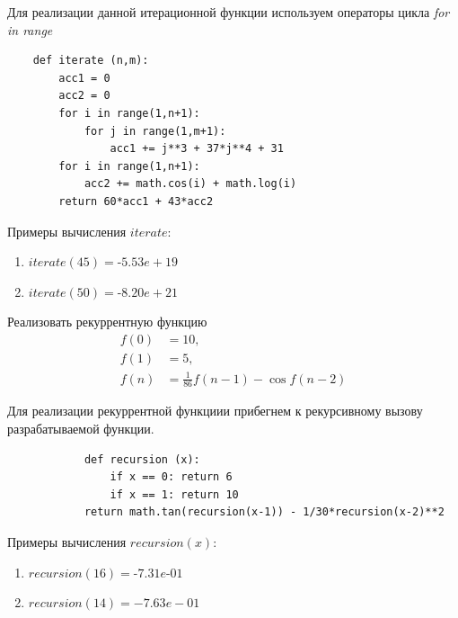 \documentclass[a4paper,14pt]{extarticle}
\begin{document}
\begin{nonum}
	Для реализации данной итерационной функции используем операторы цикла \textit{for in range}
	\vspace{3ex}
	\begin{lstlisting}
	def iterate (n,m):
		acc1 = 0
		acc2 = 0
		for i in range(1,n+1):
			for j in range(1,m+1):
				acc1 += j**3 + 37*j**4 + 31
		for i in range(1,n+1):
			acc2 += math.cos(i) + math.log(i)
		return 60*acc1 + 43*acc2
	\end{lstlisting}
	
	Примеры вычисления $iterate$:
	\begin{enumerate}
		\item $iterate(45) = ‐5.53e+19$
		\item $iterate(50) = ‐8.20e+21$
	\end{enumerate}
\end{nonum}
\begin{problem}	
	Реализовать рекуррентную функцию
	\begin{align*}
		f(0) &= 10,\\
		f(1) &= 5, \\
		f(n) &= \frac 1 {86} f(n-1) - \cos {f(n-2)}
	\end{align*}
	\begin{nonum}
		Для реализации рекуррентной функциии прибегнем к рекурсивному вызову разрабатываемой функции.
		\vspace{3ex}
		\begin{lstlisting}
			def recursion (x):
				if x == 0: return 6
				if x == 1: return 10
			return math.tan(recursion(x-1)) - 1/30*recursion(x-2)**2
		\end{lstlisting}
		\vspace{3ex}
		
		Примеры вычисления $recursion(x)$:
		\begin{enumerate}
			\item $recursion(16) = ‐7.31e‐01$
			\item $recursion(14) = -7.63e-01$
		\end{enumerate}
	\end{nonum}
	
\end{problem}
\newpage
\end{document}
